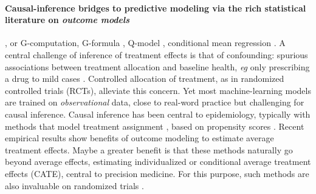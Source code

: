 \documentclass{report}
\begin{document}
\paragraph{Causal-inference bridges to predictive modeling via the rich statistical literature on \emph{outcome
    models}}, or G-computation, G-formula \citep{robins_role_1986}, Q-model \citep{snowden_implementation_2011}, conditional
mean regression \citep{wendling_comparing_2018}. A central challenge of inference of treatment effects is that of
confounding: spurious associations between treatment allocation and baseline health, \emph{eg} only prescribing a drug
to mild cases \citep{hernan_causal_2020,vanderweele2019principles}. Controlled allocation of treatment, as in randomized
controlled trials (RCTs), alleviate this concern. Yet most machine-learning models are trained on \emph{observational}
data, close to real-word practice \citep{black1996we,hernan_methods_2021} but challenging for causal inference. Causal
inference has been central to epidemiology, typically with methods that model treatment assignment
\citep{austin_moving_2015,grose_use_2020}, based on propensity scores \citep{rosenbaum_central_1983}. Recent empirical
results \citep{wendling_comparing_2018,dorie_automated_2019} show benefits of outcome modeling to estimate average
treatment effects. Maybe a greater benefit is that these methods naturally go beyond average effects, estimating
individualized or conditional average treatment effects (CATE), central to precision medicine.
%
For this purpose, such methods are also invaluable on randomized trials
\citep{su2018random,lamont2018identification,hoogland2021tutorial}.
\end{document}
